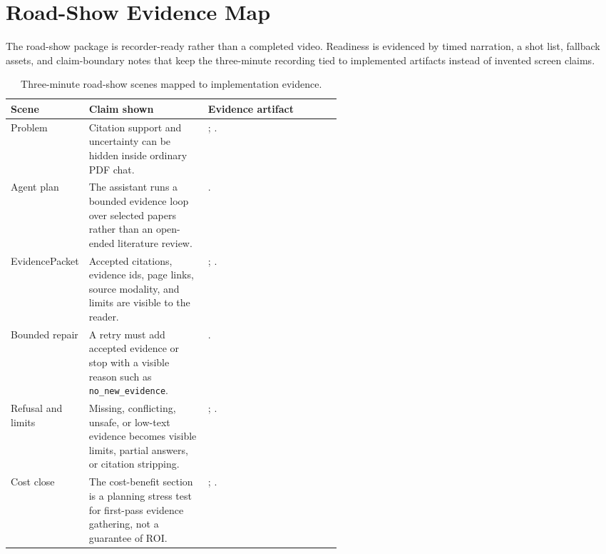 \section{Road-Show Evidence Map}
\label{app:demo-evidence}

The road-show package is recorder-ready rather than a completed video. Readiness is evidenced by timed narration, a shot list, fallback assets, and claim-boundary notes that keep the three-minute recording tied to implemented artifacts instead of invented screen claims.

\begin{table}[h]
  \caption{Three-minute road-show scenes mapped to implementation evidence.}
  \label{tab:demo-evidence-map}
  \centering
  \small
  \setlength{\tabcolsep}{4pt}
  \begin{tabularx}{\linewidth}{p{0.18\linewidth}p{0.36\linewidth}Y}
    \toprule
    Scene & Claim shown & Evidence artifact \\
    \midrule
    Problem & Citation support and uncertainty can be hidden inside ordinary PDF chat. & ; . \\
    Agent plan & The assistant runs a bounded evidence loop over selected papers rather than an open-ended literature review. & . \\
    EvidencePacket & Accepted citations, evidence ids, page links, source modality, and limits are visible to the reader. & ; . \\
    Bounded repair & A retry must add accepted evidence or stop with a visible reason such as \texttt{no\_new\_evidence}. & . \\
    Refusal and limits & Missing, conflicting, unsafe, or low-text evidence becomes visible limits, partial answers, or citation stripping. & ; . \\
    Cost close & The cost-benefit section is a planning stress test for first-pass evidence gathering, not a guarantee of ROI. & ; . \\
    \bottomrule
  \end{tabularx}
\end{table}
